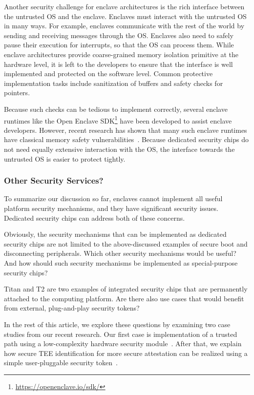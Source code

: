 Another security challenge for enclave architectures is the rich interface between the untrusted OS and the enclave. Enclaves must interact with the untrusted OS in many ways. For example, enclaves communicate with the rest of the world by sending and receiving messages through the OS. Enclaves also need to safely pause their execution for interrupts, so that the OS can process them. While enclave architectures provide coarse-grained memory isolation primitive at the hardware level, it is left to the developers to ensure that the interface is well implemented and protected on the software level. Common protective implementation tasks include sanitization of buffers and safety checks for pointers. 

Because such checks can be tedious to implement correctly, several enclave runtimes like the Open Enclave SDK\footnote{\url{https://openenclave.io/sdk/}} have been developed to assist enclave developers. However, recent research has shown that many such enclave runtimes have classical memory safety vulnerabilities~\cite{van2019tale}. Because dedicated security chips do not need equally extensive interaction with the OS, the interface towards the untrusted OS is easier to protect tightly. 


\subsubsection*{Other Security Services?}

To summarize our discussion so far, enclaves cannot implement all useful platform security mechanisms, and they have significant security issues. Dedicated security chips can address both of these concerns. 

Obviously, the security mechanisms that can be implemented as dedicated security chips are not limited to the above-discussed examples of secure boot and disconnecting peripherals. Which other security mechanisms would be useful? And how should such security mechanisms be implemented as special-purpose security chips? 

Titan and T2 are two examples of integrated security chips that are permanently attached to the computing platform. Are there also use cases that would benefit from external, plug-and-play security tokens?

In the rest of this article, we explore these questions by examining two case studies from our recent research. Our first case is implementation of a trusted path using a low-complexity hardware security module~\cite{protection}. After that, we explain how secure TEE identification for more secure attestation can be realized using a simple user-pluggable security token~\cite{proximitee}.
